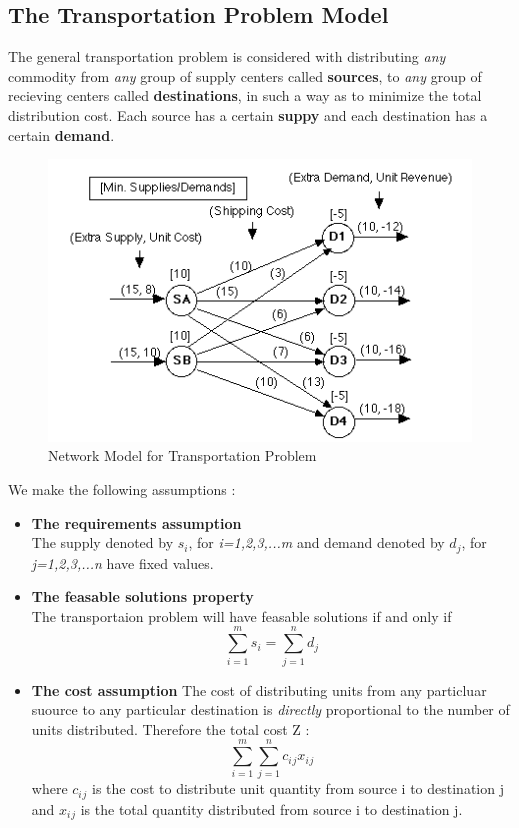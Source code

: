 \documentclass[12pt]{article}
\numberwithin{equation}{section}
\numberwithin{table}{section}
\numberwithin{figure}{section}
\begin{document}
\subsection{The Transportation Problem Model}
The general transportation problem is considered with distributing \textit{any} commodity from \textit{any} group of supply centers called \textbf{sources}, to \textit{any} group of recieving centers called \textbf{destinations}, in such a way as to minimize the total distribution cost. Each source has a certain \textbf{suppy} and each destination has a certain \textbf{demand}. 

\begin{figure}[h!]
\includegraphics[width = 15cm]{trans_graph}
\centering
\caption{Network Model for Transportation Problem}
\end{figure}

We make the following assumptions :
\begin{itemize}
	\item \textbf{The requirements assumption}\\
		The supply denoted by $s_i$, for \textit{i=1,2,3,...m} and demand denoted by $d_j$, for \textit{j=1,2,3,...n} have fixed values.
	\item \textbf{The feasable solutions property}\\
		The transportaion problem will have feasable solutions if and only if 
		\[ \sum_{i=1}^ms{_i} = \sum_{j=1}^nd{_j} \]
	\item \textbf{The cost assumption}
		The cost of distributing units from any particluar suource to any particular destination is \textit{directly} proportional to the number of units distributed. Therefore the total cost Z :
		\[ \sum_{i=1}^m \sum_{j=1}^nc{_i}{_j}x{_i}{_j} \]
		where $c{_i}{_j}$ is the cost to distribute unit quantity from source i to destination j and $x{_i}{_j}$ is the total quantity distributed from source i to destination j.
\end{itemize}
\end{document}
